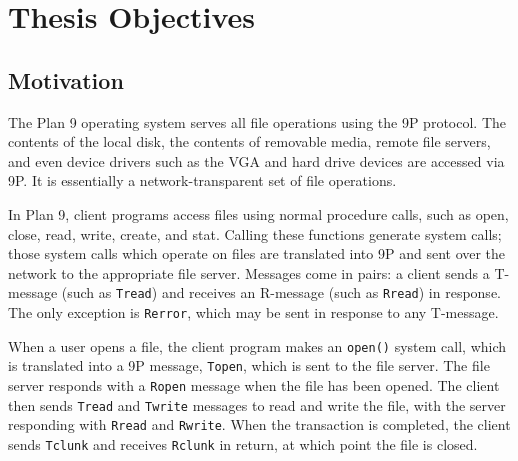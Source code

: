 \documentclass[12pt,american]{report}
\begin{document}
\tablespagefalse

\figurespagefalse


\body%
\chapter{Thesis Objectives}
\section{Motivation}
The Plan 9 operating system serves all file operations using the 9P protocol. The contents of the local disk, the contents of removable media, remote file servers, and even device drivers such as the VGA and hard drive devices are accessed via 9P. It is essentially a network-transparent set of file operations.

In Plan 9, client programs access files using normal procedure calls, such as open, close, read, write, create, and stat. Calling these functions generate system calls; those system calls which operate on files are translated into 9P and sent over the network to the appropriate file server. Messages come in pairs: a client sends a T-message (such as {\tt Tread}) and receives an R-message (such as {\tt Rread}) in response. The only exception is {\tt Rerror}, which may be sent in response to any T-message.

When a user opens a file, the client program makes an {\tt open()} system call, which is translated into a 9P message, {\tt Topen}, which is sent to the file server. The file server responds with a {\tt Ropen} message when the file has been opened. The client then sends {\tt Tread} and {\tt Twrite} messages to read and write the file, with the server responding with {\tt Rread} and {\tt Rwrite}. When the transaction is completed, the client sends {\tt Tclunk} and receives {\tt Rclunk} in return, at which point the file is closed.
\end{document}
